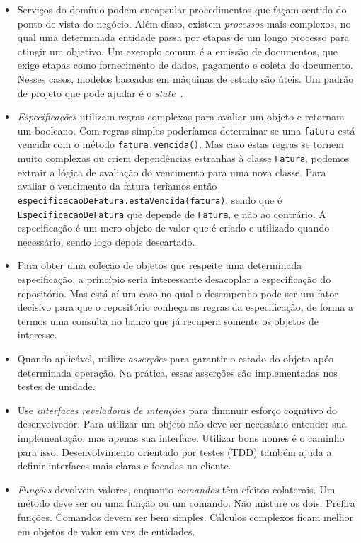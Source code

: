 \documentclass[a4paper, 12pt]{article}
\newcommand{\code}[1]{\texttt{#1}}
\begin{document}
\begin{itemize}
\item Serviços do domínio podem encapsular procedimentos que façam sentido do ponto de vista do negócio. Além disso, existem \emph{processos} mais complexos, no qual uma determinada entidade passa por etapas de um longo processo para atingir um objetivo. Um exemplo comum é a emissão de documentos, que exige etapas como fornecimento de dados, pagamento e coleta do documento. Nesses casos, modelos baseados em máquinas de estado são úteis. Um padrão de projeto que pode ajudar é o \emph{state}~\cite{Freeman2004Patterns}.

\item \emph{Especificações} utilizam regras complexas para avaliar um objeto e retornam um booleano. Com regras simples poderíamos determinar se uma \code{fatura} está vencida com o método \code{fatura.vencida()}. Mas caso estas regras se tornem muito complexas ou criem dependências estranhas à classe \code{Fatura}, podemos extrair a lógica de avaliação do vencimento para uma nova classe. Para avaliar o vencimento da fatura teríamos então \code{especificacaoDeFatura.estaVencida(fatura)}, sendo que é \code{EspecificacaoDeFatura} que depende de \code{Fatura}, e não ao contrário. A especificação é um mero objeto de valor que é criado e utilizado quando necessário, sendo logo depois descartado.

\item Para obter uma coleção de objetos que respeite uma determinada especificação, a princípio seria interessante desacoplar a especificação do repositório. Mas está aí um caso no qual o desempenho pode ser um fator decisivo para que o repositório conheça as regras da especificação, de forma a termos uma consulta no banco que já recupera somente os objetos de interesse.

\item Quando aplicável, utilize \emph{asserções} para garantir o estado do objeto após determinada operação. Na prática, essas asserções são implementadas nos testes de unidade.

\item Use \emph{interfaces reveladoras de intenções} para diminuir esforço cognitivo do desenvolvedor. Para utilizar um objeto não deve ser necessário entender sua implementação, mas apenas sua interface. Utilizar bons nomes é o caminho para isso. Desenvolvimento orientado por testes (TDD) também ajuda a definir interfaces mais claras e focadas no cliente.

\item \emph{Funções} devolvem valores, enquanto \emph{comandos} têm efeitos colaterais. Um método deve ser ou uma função ou um comando. Não misture os dois. Prefira funções. Comandos devem ser bem simples. Cálculos complexos ficam melhor em objetos de valor em vez de entidades.


\end{itemize}
\end{document}
